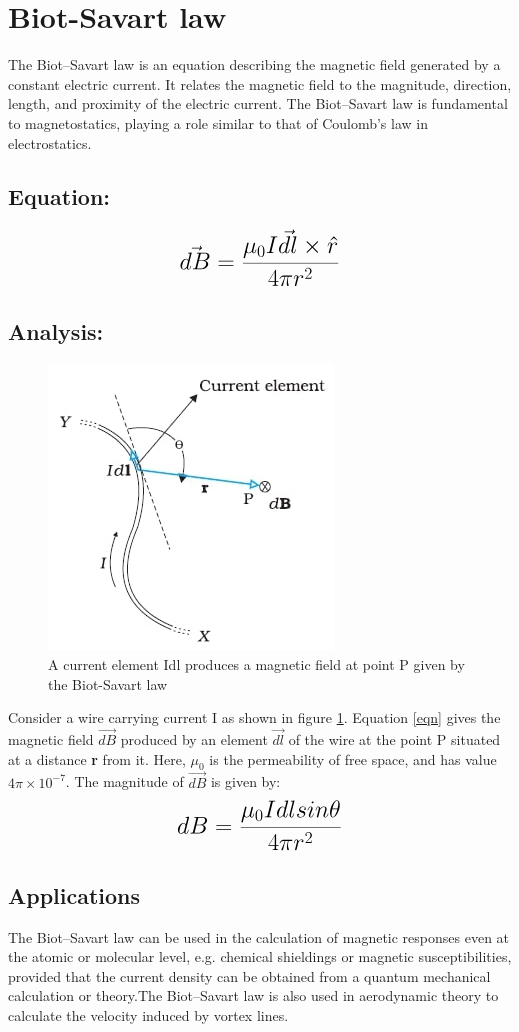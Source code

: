 
\section{Biot-Savart law}
The Biot–Savart law is an equation describing the magnetic field generated by a constant electric current. It relates the magnetic field to the magnitude, direction, length, and proximity of the electric current. The Biot–Savart law is fundamental to magnetostatics, playing a role similar to that of Coulomb's law in electrostatics.\cite{webref1}
\subsection{Equation:}
\begin{equation}
    {\LARGE{\textbf{$\vec{dB}=\frac{\mu_{0} I\vec{dl}\times\hat{r}}{4\pi r^2}$}}}
    \label{eqn}
\end{equation}
\subsection{Analysis:}
\begin{figure}[h]
	{\begin{center}
		\includegraphics[scale=0.5]{ME20B029.jpg}
	\end{center}}
	\caption{A current element Idl produces a magnetic field at point P given by the Biot-Savart law \cite{picture}}
	\label{fig}
\end{figure}
Consider a wire carrying current I as shown in figure \ref{fig}. Equation \ref{eqn} gives the magnetic field {$\vec{dB}$} produced by an element {$\vec{dl}$} 
of the wire at the point P situated at a distance {\textbf{r}} from it. Here, {$\mu_{0}$} is the permeability of free space, and has value {$4\pi\times10^{-7}$}.\cite{webref2}
The magnitude of {$\vec{dB}$} is given by: 
\begin{equation}
{\LARGE{\textbf{${dB}=\frac{\mu_{0} Idlsin\theta}{4\pi r^2}$}}}
\end{equation}
\subsection{Applications}
The Biot–Savart law can be used in the calculation of magnetic responses even at the atomic or molecular level, e.g. chemical shieldings or magnetic susceptibilities, provided that the current density can be obtained from a quantum mechanical calculation or theory.The Biot–Savart law is also used in aerodynamic theory to calculate the velocity induced by vortex lines.\cite{webref1}

